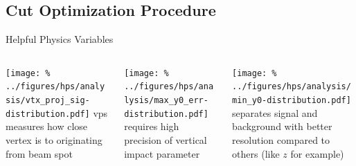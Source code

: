 \documentclass[aspectratio=169]{beamer}
\begin{document}

\subsection{Cut Optimization Procedure}
\begin{frame}{Helpful Physics Variables}
  \begin{columns}
    \begin{column}{0.3\textwidth}
      \texttt{[image: \%
        ../figures/hps/analysis/vtx\_proj\_sig-distribution.pdf]}
      \ac{vps} measures how close vertex
      is to originating from beam spot
    \end{column}
    \begin{column}{0.3\textwidth}
      \texttt{[image: \%
        ../figures/hps/analysis/max\_y0\_err-distribution.pdf]}
      \maxyzeroerr requires high precision
      of vertical impact parameter
    \end{column}
    \begin{column}{0.3\textwidth}
      \texttt{[image: \%
        ../figures/hps/analysis/min\_y0-distribution.pdf]}
      \minyzero separates signal and background
      with better resolution compared to others
      (like $z$ for example)
    \end{column}
  \end{columns}
\end{frame}

\end{document}
